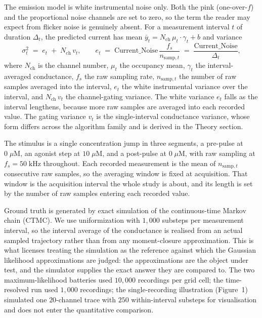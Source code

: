 The emission model is white instrumental noise only. Both the pink (one-over-$f$)
and the proportional noise channels are set to zero, so the term the reader may
expect from flicker noise is genuinely absent.
For a measurement interval $t$ of duration $\Delta_t$, the predicted current has
mean $\bar y_t = N_{\mathrm{ch}}\,\mu_t\!\cdot\!\gamma_t + b$ and variance
\[
  \sigma_t^2 \;=\; e_t \;+\; N_{\mathrm{ch}}\,v_t ,
  \qquad
  e_t \;=\; \mathrm{Current\_Noise}\,\frac{f_s}{n_{\mathrm{samp},t}}
        \;=\; \frac{\mathrm{Current\_Noise}}{\Delta_t},
\]
where $N_{\mathrm{ch}}$ is the channel number, $\mu_t$ the occupancy mean, $\gamma_t$
the interval-averaged conductance, $f_s$ the raw sampling rate, $n_{\mathrm{samp},t}$
the number of raw samples averaged into the interval, $e_t$ the white instrumental
variance over the interval, and $N_{\mathrm{ch}}\,v_t$ the channel-gating variance.
The white variance $e_t$ falls as the interval lengthens, because more raw samples
are averaged into each recorded value. The gating variance $v_t$ is the
single-interval conductance variance, whose form differs across the algorithm
family and is derived in the Theory section.

The stimulus is a single concentration jump in three segments, a pre-pulse at
$0\;\mu\mathrm{M}$, an agonist step at $10\;\mu\mathrm{M}$, and a post-pulse at
$0\;\mu\mathrm{M}$, with raw sampling at $f_s = 50\;\mathrm{kHz}$ throughout.
Each recorded measurement is the mean of $n_{\mathrm{samp},t}$ consecutive raw
samples, so the averaging window is fixed at acquisition. That window is the
acquisition interval the whole study is about, and its length is set by the
number of raw samples entering each recorded value.

Ground truth is generated by exact simulation of the continuous-time Markov chain
(CTMC). We use uniformization with $1{,}000$ substeps per measurement interval, so
the interval average of the conductance is realised from an actual sampled
trajectory rather than from any moment-closure approximation.
This is what licenses treating the simulation as the reference against which the
Gaussian likelihood approximations are judged: the approximations are the object
under test, and the simulator supplies the exact answer they are compared to. The
two maximum-likelihood batteries used $10{,}000$ recordings per grid cell; the
time-resolved run used $1{,}000$ recordings; the single-recording illustration
(Figure~1) simulated one $20$-channel trace with $250$ within-interval substeps for
visualisation and does not enter the quantitative comparison.

